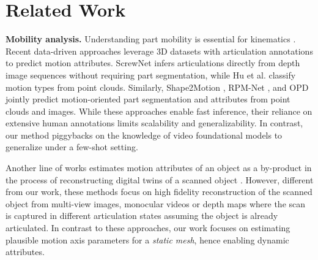 \section{Related Work}
\label{sec:related work}

\noindent\textbf{Mobility analysis.} Understanding part mobility is essential for kinematics \cite{abbatematteo2019learning, mo2021where2act}. Recent data-driven approaches leverage 3D datasets with articulation annotations to predict motion attributes. ScrewNet \cite{jain2021screwnet} infers articulations directly from depth image sequences without requiring part segmentation, while Hu et al. \cite{hu2017learning} classify motion types from point clouds. Similarly, Shape2Motion \cite{wang2019shape2motion}, RPM-Net \cite{yan2020rpm}, and OPD \cite{jiang2022opd} jointly predict motion-oriented part segmentation and attributes from point clouds and images. While these approaches enable fast inference, their reliance on extensive human annotations limits scalability and generalizability. In contrast, our method piggybacks on the knowledge of video foundational models to generalize under a few-shot setting. 

Another line of works estimates motion attributes of an object as a by-product in the process of reconstructing digital twins of a scanned object \cite{jiang2022ditto, liu2023paris, wei2022nasam, song2024reacto, mandi2024real2code}. However, different from our work, these methods focus on high fidelity reconstruction of the scanned object from multi-view images, monocular videos or depth maps where the scan is captured in different articulation states assuming the object is already articulated. In contrast to these approaches, our work focuses on estimating plausible motion axis parameters for a {\em static mesh}, hence enabling dynamic attributes.

